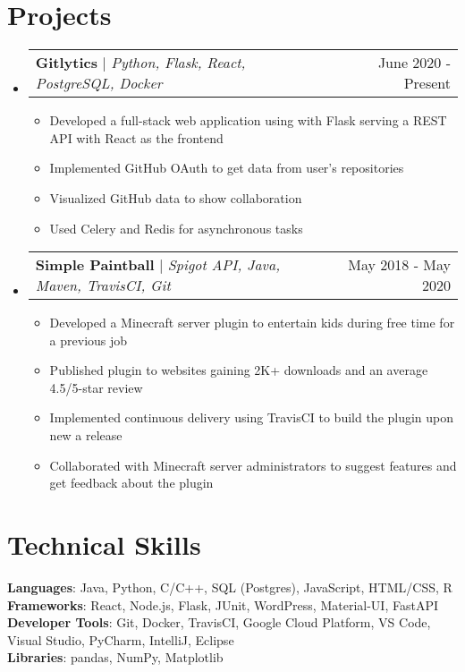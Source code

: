 \documentclass[letterpaper,11pt]{article}%
\makeatletter
\newcommand{\resumeItem}[1]{
  \item\small{
    {#1 \vspace{-2pt}}
  }
}
\newcommand{\resumeProjectHeading}[2]{
    \item
    \begin{tabular*}{0.97\textwidth}{l@{\extracolsep{\fill}}r}
      \small#1 & #2 \\
    \end{tabular*}\vspace{-7pt}
}
\newcommand{\resumeSubHeadingListStart}{\begin{itemize}[leftmargin=0.15in, label={}]}
\newcommand{\resumeSubHeadingListEnd}{\end{itemize}}
\newcommand{\resumeItemListStart}{\begin{itemize}}
\newcommand{\resumeItemListEnd}{\end{itemize}\vspace{-5pt}}
\makeatother
\begin{document}
%
\section*{Projects}%
\label{sec:Projects}%
\resumeSubHeadingListStart%
\resumeProjectHeading{\textbf{Gitlytics} $|$ \emph{Python, Flask, React, PostgreSQL, Docker}}{June 2020 {-} Present}%
\resumeItemListStart%
\resumeItem{Developed a full{-}stack web application using with Flask serving a REST API with React as the frontend}%
\resumeItem{Implemented GitHub OAuth to get data from user's repositories}%
\resumeItem{Visualized GitHub data to show collaboration}%
\resumeItem{Used Celery and Redis for asynchronous tasks}%
\resumeItemListEnd%
\resumeProjectHeading{\textbf{Simple Paintball} $|$ \emph{Spigot API, Java, Maven, TravisCI, Git}}{May 2018 {-} May 2020}%
\resumeItemListStart%
\resumeItem{Developed a Minecraft server plugin to entertain kids during free time for a previous job}%
\resumeItem{Published plugin to websites gaining 2K+ downloads and an average 4.5/5{-}star review}%
\resumeItem{Implemented continuous delivery using TravisCI to build the plugin upon new a release}%
\resumeItem{Collaborated with Minecraft server administrators to suggest features and get feedback about the plugin}%
\resumeItemListEnd%
\resumeSubHeadingListEnd

%
\section*{Technical Skills}%
\label{sec:TechnicalSkills}%
\begin{itemize}[leftmargin=0.15in, label={}]%
    \small{\item{%
\textbf{Languages}{: Java, Python, C/C++, SQL (Postgres), JavaScript, HTML/CSS, R} \\ \textbf{Frameworks}{: React, Node.js, Flask, JUnit, WordPress, Material{-}UI, FastAPI} \\ \textbf{Developer Tools}{: Git, Docker, TravisCI, Google Cloud Platform, VS Code, Visual Studio, PyCharm, IntelliJ, Eclipse} \\ \textbf{Libraries}{: pandas, NumPy, Matplotlib}%
    }}%
\end{itemize}

%
\end{document}

